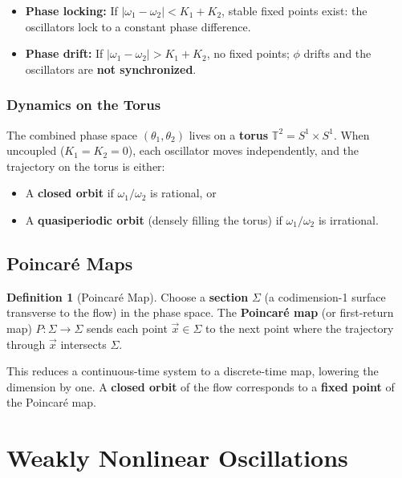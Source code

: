 \documentclass[11pt,letterpaper]{article}
\theoremstyle{definition}
\newtheorem{definition}{Definition}[section]
\theoremstyle{plain}
\theoremstyle{remark}
\begin{document}
\begin{itemize}[leftmargin=2em]
\item \textbf{Phase locking:}  If $|\omega_1 - \omega_2| < K_1 + K_2$,
      stable fixed points exist: the oscillators lock to a constant phase
      difference.
\item \textbf{Phase drift:}  If $|\omega_1 - \omega_2| > K_1 + K_2$,
      no fixed points; $\phi$ drifts and the oscillators are
      \textbf{not synchronized}.
\end{itemize}

\subsubsection{Dynamics on the Torus}

The combined phase space $(\theta_1,\theta_2)$ lives on a \textbf{torus}
$\mathbb{T}^2 = S^1 \times S^1$.  When uncoupled ($K_1=K_2=0$), each
oscillator moves independently, and the trajectory on the torus is either:
\begin{itemize}[leftmargin=2em]
\item A \textbf{closed orbit} if $\omega_1/\omega_2$ is rational, or
\item A \textbf{quasiperiodic orbit} (densely filling the torus) if
      $\omega_1/\omega_2$ is irrational.
\end{itemize}

\subsection{Poincar\'e Maps}\label{sec:poincare-maps}

\begin{definition}[Poincar\'e Map]
Choose a \textbf{section} $\Sigma$ (a codimension-1 surface transverse to
the flow) in the phase space.  The \textbf{Poincar\'e map} (or first-return
map) $P:\Sigma\to\Sigma$ sends each point $\vec{x}\in\Sigma$ to the next
point where the trajectory through $\vec{x}$ intersects $\Sigma$.
\end{definition}

This reduces a continuous-time system to a discrete-time map, lowering the
dimension by one.  A \textbf{closed orbit} of the flow corresponds to a
\textbf{fixed point} of the Poincar\'e map.


\section{Weakly Nonlinear Oscillations}\label{sec:weakly-nonlinear}
\end{document}
